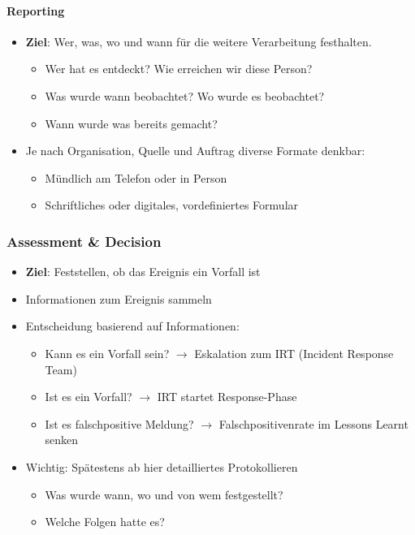 \paragraph{Reporting}
\begin{itemize}
    \item \textbf{Ziel}: Wer, was, wo und wann für die weitere Verarbeitung festhalten.
    \begin{itemize}
        \item Wer hat es entdeckt? Wie erreichen wir diese Person?
        \item Was wurde wann beobachtet? Wo wurde es beobachtet?
        \item Wann wurde was bereits gemacht?
    \end{itemize}
    \item Je nach Organisation, Quelle und Auftrag diverse Formate denkbar:
    \begin{itemize}
        \item Mündlich am Telefon oder in Person
        \item Schriftliches oder digitales, vordefiniertes Formular
    \end{itemize}
\end{itemize}

\subsubsection{Assessment \& Decision}
\begin{itemize}
    \item \textbf{Ziel}: Feststellen, ob das Ereignis ein Vorfall ist
    \item Informationen zum Ereignis sammeln
    \item Entscheidung basierend auf Informationen:
    \begin{itemize}
        \item Kann es ein Vorfall sein? $\rightarrow$ Eskalation zum IRT (Incident Response Team)
        \item Ist es ein Vorfall? $\rightarrow$ IRT startet Response-Phase
        \item Ist es falschpositive Meldung? $\rightarrow$ Falschpositivenrate im Lessons Learnt senken
    \end{itemize}
    \item Wichtig: Spätestens ab hier detailliertes Protokollieren
    \begin{itemize}
        \item Was wurde wann, wo und von wem festgestellt?
        \item Welche Folgen hatte es?
    \end{itemize}
\end{itemize}

